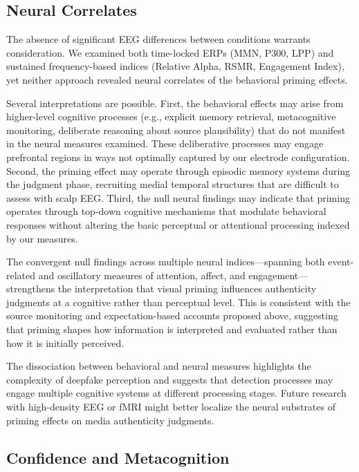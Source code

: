 \documentclass[12pt, a4paper]{article}
\begin{document}
\subsection{Neural Correlates}

The absence of significant EEG differences between conditions warrants consideration. We examined both time-locked ERPs (MMN, P300, LPP) and sustained frequency-based indices (Relative Alpha, RSMR, Engagement Index), yet neither approach revealed neural correlates of the behavioral priming effects.

Several interpretations are possible. First, the behavioral effects may arise from higher-level cognitive processes (e.g., explicit memory retrieval, metacognitive monitoring, deliberate reasoning about source plausibility) that do not manifest in the neural measures examined. These deliberative processes may engage prefrontal regions in ways not optimally captured by our electrode configuration. Second, the priming effect may operate through episodic memory systems during the judgment phase, recruiting medial temporal structures that are difficult to assess with scalp EEG. Third, the null neural findings may indicate that priming operates through top-down cognitive mechanisms that modulate behavioral responses without altering the basic perceptual or attentional processing indexed by our measures.

The convergent null findings across multiple neural indices---spanning both event-related and oscillatory measures of attention, affect, and engagement---strengthens the interpretation that visual priming influences authenticity judgments at a cognitive rather than perceptual level. This is consistent with the source monitoring and expectation-based accounts proposed above, suggesting that priming shapes how information is interpreted and evaluated rather than how it is initially perceived.

The dissociation between behavioral and neural measures highlights the complexity of deepfake perception and suggests that detection processes may engage multiple cognitive systems at different processing stages. Future research with high-density EEG or fMRI might better localize the neural substrates of priming effects on media authenticity judgments.

\subsection{Confidence and Metacognition}
\end{document}
